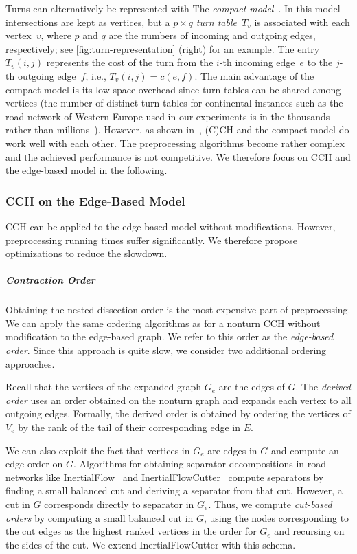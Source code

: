 \documentclass[a4paper, english, cleveref]{lipics-v2021}
\begin{document}
Turns can alternatively be represented with The \emph{compact model}~\cite{GeisbergerV11, DellingGPW17}.
In this model intersections are kept as vertices, but a $p \times q$ \emph{turn table}~$T_v$ is associated with each vertex~$v$, where $p$ and $q$ are the numbers of incoming and outgoing edges, respectively; see \cref{fig:turn-representation} (right) for an example.
The entry~$T_v(i, j)$ represents the cost of the turn from the $i$-th incoming edge~$e$ to the $j$-th outgoing edge~$f$, i.e., $T_v(i, j) = c(e, f)$.
The main advantage of the compact model is its low space overhead since turn tables can be shared among vertices (the number of distinct turn tables for continental instances such as the road network of Western Europe used in our experiments is in the thousands rather than millions~\cite{DellingGPW17}).
However, as shown in~\cite{GeisbergerV11, TODO}, (C)CH and the compact model do work well with each other.
The preprocessing algorithms become rather complex and the achieved performance is not competitive.
We therefore focus on CCH and the edge-based model in the following.

\subsubsection{CCH on the Edge-Based Model}
\label{sec:cch-on-edge-based-model}

CCH can be applied to the edge-based model without modifications.
However, preprocessing running times suffer significantly.
We therefore propose optimizations to reduce the slowdown.

\subparagraph*{Contraction Order}

Obtaining the nested dissection order is the most expensive part of preprocessing.
We can apply the same ordering algorithms as for a nonturn CCH without modification to the edge-based graph.
We refer to this order as the \emph{edge-based order}.
Since this approach is quite slow, we consider two additional ordering approaches.

Recall that the vertices of the expanded graph $G_e$ are the edges of $G$.
The \emph{derived order} uses an order obtained on the nonturn graph and expands each vertex to all outgoing edges.
Formally, the derived order is obtained by ordering the vertices of $V_e$ by the rank of the tail of their corresponding edge in $E$.

We can also exploit the fact that vertices in $G_e$ are edges in $G$ and compute an edge order on $G$.
Algorithms for obtaining separator decompositions in road networks like InertialFlow~\cite{SchildS15} and InertialFlowCutter~\cite{GottesburenHUW19} compute separators by finding a small balanced cut and deriving a separator from that cut.
However, a cut in $G$ corresponds directly to separator in $G_e$.
Thus, we compute \emph{cut-based orders} by computing a small balanced cut in $G$, using the nodes corresponding to the cut edges as the highest ranked vertices in the order for $G_e$ and recursing on the sides of the cut.
We extend InertialFlowCutter with this schema.
\end{document}
